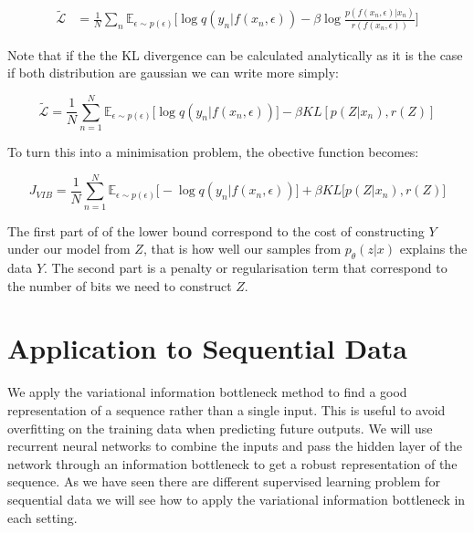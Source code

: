 \documentclass[10pt,oneside,openright]{report}
\begin{document}
 \begin{align}
\tilde{\mathcal{L}}   &= \frac{1}{N}\sum_n  \mathbb{E}_{\epsilon \sim p(\epsilon)}\Big[  \log q(y_n|f(x_n, \epsilon)) - \beta  \log \frac{p(f(x_n, \epsilon)|x_n)}{r(f(x_n, \epsilon))}\Big]  \label{eq:lower2}
\end{align}

Note that if the the KL divergence can be calculated analytically as it is the case if both distribution are gaussian we can write more simply:

 $$ \tilde{\mathcal{L}}  = \frac{1}{N}  \sum_{n=1}^{N} \mathbb{E}_{\epsilon \sim p(\epsilon)}\Big[\log q(y_{n} |f(x_{n}, \epsilon))\Big] - \beta KL[p(Z|x_{n}), r(Z)]$$

To turn this into a minimisation problem, the obective function becomes:

 $$ J_{VIB} = \frac{1}{N}  \sum_{n=1}^{N} \mathbb{E}_{\epsilon \sim p(\epsilon)}\Big[-\log q(y_{n} |f(x_{n}, \epsilon))\Big] + \beta KL\big[p(Z|x_{n}), r(Z)\big]$$


The first part of of the lower bound correspond to the cost of constructing $Y$ under our model from $Z$, that is how well our samples from $p_\theta(z|x)$ explains the data $Y$. The second part is a penalty or regularisation term that correspond to the number of bits we need to construct $Z$.

\section{Application to Sequential Data}

We apply the variational information bottleneck method to find a good representation of a sequence rather than a single input. This is useful to avoid overfitting on the training data when predicting future outputs. We will use recurrent neural networks to combine the inputs and pass the hidden layer of the network through an information bottleneck to get a robust representation of the sequence. As we have seen there are different supervised learning problem for sequential data we will see how to apply the variational information bottleneck in each setting.
\end{document}
